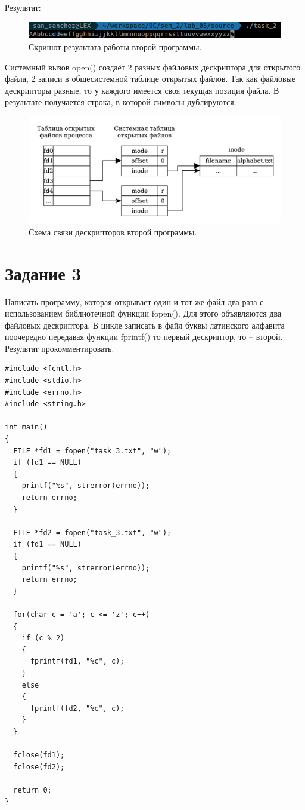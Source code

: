 Результат:
\begin{figure}[H]
    \centering
    \includegraphics[scale=0.5]{data/image/task_2.png}
    \caption{Скришот результата работы второй программы.}
\end{figure}

Системный вызов open() создаёт 2 разных файловых дескриптора для открытого файла, 2 записи в общесистемной таблице открытых файлов. Так как файловые дескрипторы разные, то у каждого имеется своя текущая позиция файла.
В результате получается строка, в которой символы дублируются.

\begin{figure}[H]
    \centering
    \includegraphics[scale=0.75]{data/pdf/task_2.pdf}
    \caption{Схема связи дескрипторов второй программы.}
\end{figure}

\section{Задание \No{}3}
Написать программу, которая открывает один и тот же файл два раза с использованием
библиотечной функции fopen(). Для этого объявляются два файловых дескриптора. В цикле
записать в файл буквы латинского алфавита поочередно передавая функции fprintf() то
первый дескриптор, то – второй.
Результат прокомментировать.

\lstset{language=c}
\begin{lstlisting}[caption=Текст программы третьего задания]
#include <fcntl.h>
#include <stdio.h>
#include <errno.h>
#include <string.h>

int main()
{
  FILE *fd1 = fopen("task_3.txt", "w");
  if (fd1 == NULL)
  {
    printf("%s", strerror(errno));
    return errno;
  }

  FILE *fd2 = fopen("task_3.txt", "w");
  if (fd1 == NULL)
  {
    printf("%s", strerror(errno));
    return errno;
  }

  for(char c = 'a'; c <= 'z'; c++)
  {
    if (c % 2)
    {
      fprintf(fd1, "%c", c);
    }
    else
    {
      fprintf(fd2, "%c", c);
    }
  }

  fclose(fd1);
  fclose(fd2);

  return 0;
}
\end{lstlisting}

